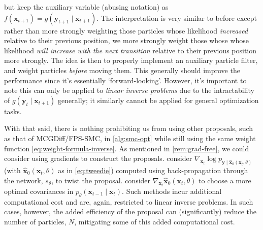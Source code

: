 but keep the auxiliary variable (abusing notation) as
$f(\mathbf{x}_{t+1}) = g(\mathbf{y}_{t+1} \mid \mathbf{x}_{t+1})$. The interpretation is very
similar to before except rather than more strongly weighting those particles whose likelihood
\emph{increased} relative to their previous position, we more strongly weight those whose whose
likelihood \emph{will increase with the next transition} relative to their previous position more
strongly. The idea is then to properly implement an auxiliary particle filter, and weight particles
\emph{before} moving them. This generally should improve the performance since it's essentially
`forward-looking'. However, it's important to note this can only be applied to \emph{linear
inverse problems} due to the intractability of $g(\mathbf{y}_t \mid \mathbf{x}_{t+1})$ generally;
it similarly cannot be applied for general optimization tasks.

With that said, there is nothing prohibiting us from using other proposals, such as that of
MCGDiff/FPS-SMC, in \ref{alg:smc-opt} while still using the same weight function
\ref{eq:weight-formula-inverse}. As mentioned in \ref{rem:grad-free}, we could consider using
gradients to construct the proposals. \textcite{wuPracticalAsymptoticallyExact2023} consider
$\nabla_{\mathbf{x}_t}\log p_{\mathbf{y} \mid \hat{\mathbf{x}}_0(\mathbf{x}_t, \theta)}$ (with
$\hat{\mathbf{x}}_0(\mathbf{x}_t, \theta)$ as in \ref{eq:tweedie}) computed using back-propagation
through the network, $s_\theta$, to twist the proposal. \textcite{boysTweedieMomentProjected2023}
consider $\nabla_{\mathbf{x}_t}\hat{\mathbf{x}}_0(\mathbf{x}_t, \theta)$ to choose a more optimal
covariances in $p_\theta(\mathbf{x}_{t-1} \mid \mathbf{x}_t)$. Such methods incur additional
computational cost and are, again, restricted to linear inverse problems. In such cases, however,
the added efficiency of the proposal can (significantly) reduce the number of particles, $N$,
mitigating some of this added computational cost.
